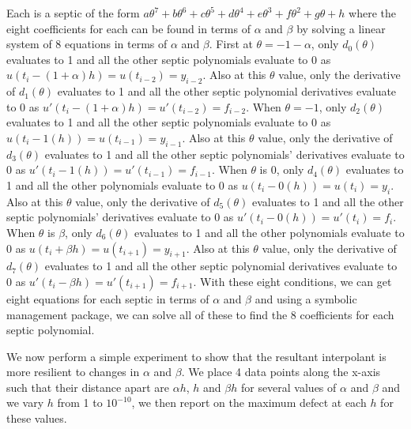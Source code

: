 Each is a septic of the form $a\theta^7 + b\theta^6 + c\theta^5 + d\theta^4 + e\theta^3 + f\theta^2 + g\theta + h$ where the eight coefficients for each can be found in terms of $\alpha$ and $\beta$ by solving a linear system of 8 equations in terms of $\alpha$ and $\beta$. First at $\theta = -1-\alpha$, only $d_0(\theta)$ evaluates to 1 and all the other septic polynomials evaluate to 0 as $u(t_i - (1+\alpha) h) = u(t_{i - 2}) = y_{i - 2}$. Also at this $\theta$ value, only the derivative of $d_1(\theta)$ evaluates to 1 and all the other septic polynomial derivatives evaluate to 0 as $u'(t_i - (1+\alpha) h) = u'(t_{i - 2}) = f_{i - 2}$. When $\theta = -1$, only $d_2(\theta)$ evaluates to 1 and all the other septic polynomials evaluate to 0 as $u(t_i - 1(h)) = u(t_{i - 1}) = y_{i - 1}$. Also at this $\theta$ value, only the derivative of $d_3(\theta)$ evaluates to 1 and all the other septic polynomials' derivatives evaluate to 0 as $u'(t_i - 1(h)) = u'(t_{i - 1}) = f_{i - 1}$. When $\theta$ is 0, only $d_4(\theta)$ evaluates to 1 and all the other polynomials evaluate to 0 as $u(t_i - 0(h)) = u(t_i) = y_i$. Also at this $\theta$ value, only the derivative of $d_5(\theta)$ evaluates to 1 and all the other septic polynomials' derivatives evaluate to 0 as $u'(t_i - 0(h)) = u'(t_i) = f_i$. When $\theta$ is $\beta$, only $d_6(\theta)$ evaluates to 1 and all the other polynomials evaluate to 0 as $u(t_i + \beta h) = u(t_{i+1}) = y_{i+1}$. Also at this $\theta$ value, only the derivative of $d_7(\theta)$ evaluates to 1 and all the other septic polynomial derivatives evaluate to 0 as $u'(t_i - \beta h) = u'(t_{i+1}) = f_{i+1}$. With these eight conditions, we can get eight equations for each septic in terms of $\alpha$ and $\beta$ and using a symbolic management package, we can solve all of these to find the 8 coefficients for each septic polynomial.

We now perform a simple experiment to show that the resultant interpolant is more resilient to changes in $\alpha$ and $\beta$. We place 4 data points along the x-axis such that their distance apart are $\alpha h$, $h$ and $\beta h$ for several values of $\alpha$ and $\beta$ and we vary $h$ from 1 to $10^{-10}$, we then report on the maximum defect at each $h$ for these values.

